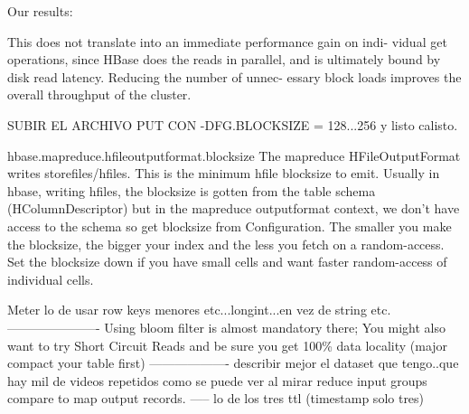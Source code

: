 \begin{itemize}
Our results:


This does not translate into an immediate performance gain on indi-
vidual get operations, since HBase does the reads in parallel, and is
ultimately bound by disk read latency. Reducing the number of unnec-
essary block loads improves the overall throughput of the cluster.




 


\end{itemize}

SUBIR EL ARCHIVO PUT CON -DFG.BLOCKSIZE = 128...256 y listo calisto.


hbase.mapreduce.hfileoutputformat.blocksize
The mapreduce HFileOutputFormat writes storefiles/hfiles. This is the minimum hfile blocksize to emit. Usually in hbase, writing hfiles, the blocksize is gotten from the table schema (HColumnDescriptor) but in the mapreduce outputformat context, we don't have access to the schema so get blocksize from Configuration. The smaller you make the blocksize, the bigger your index and the less you fetch on a random-access. Set the blocksize down if you have small cells and want faster random-access of individual cells.








Meter lo de usar row keys menores etc...longint...en vez de string etc.
----------------------
Using bloom filter is almost mandatory there;
You might also want to try Short Circuit Reads and be sure you get 100\%
data locality (major compact your table first)
-------------------
describir mejor el dataset que tengo..que hay mil de videos repetidos como se puede ver al mirar reduce input groups compare to map output records.
-----
lo de los tres ttl (timestamp solo tres)

